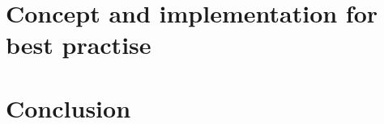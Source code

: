 \documentclass[conference]{IEEEtran}
\begin{document}
\section{Concept and implementation for best practise}


\section{Conclusion}
\end{document}
